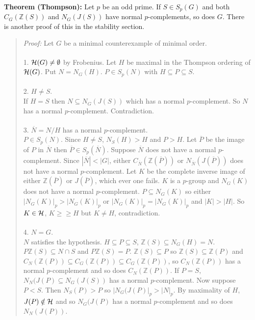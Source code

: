 {\bf Theorem (Thompson):}  Let $p$ be an odd prime.  If $S \in S_p(G)$ and both $C_G({\mathbb Z}(S))$ and $N_G(J(S))$ have normal $p$-complements, so does $G$.  There is another proof of this in the
stability section.
\begin{quote}
\emph{Proof:}
Let $G$ be a minimal counterexample of minimal order.
\\
\\
1. ${\cal H}(G) \neq \emptyset$ by Frobenius. Let $H$ be maximal in the Thompson ordering of ${\cal H}(G)$.
Put $N = N_G(H)$.  $P \in S_p(N)$ with $H \subseteq P \subseteq S$.
\\
\\
2. $H \neq S$.
\\
If $H = S$ then $N \subseteq N_G(J(S))$ which has a normal $p$-complement.
So $N$ has a normal $p$-complement.
Contradiction.
\\
\\
3. ${\overline N} = N/H$ has a normal $p$-complement.
\\
$P \in S_p(N)$.  Since $H \neq S$, $N_S(H) > H$ and $P > H$.
Let ${\overline P}$ be the image of $P$ in ${\overline N}$ then ${\overline P} \in S_p({\overline N})$.
Suppose ${\overline N}$ does not have a normal $p$-complement.  Since $|{\overline N}| < |G|$, either
$C_{\overline N}({\mathbb Z}({\overline P}))$ or $N_{\overline N}(J({\overline P}))$ does not have a normal $p$-complement.
Let $K$ be the complete inverse image of either ${\mathbb Z}({\overline P})$ or $J({\overline P})$, which ever one fails.
$K$ is a $p$-group and $N_G(K)$ does not have a normal $p$-complement.
$P \subseteq N_G(K)$ so either $|N_G(K)|_p > |N_G(K)|_p$ or
$|N_G(K)|_p = |N_G(K)|_p$ and $|K| > |H|$.  So $K \in {\cal H}$, $K \geq \geq H$ but $K \neq H$, contradiction.
\\
\\
4. $N = G$.
\\
$N$ satisfies the hypothesis. $H \subseteq P \subseteq S$, ${\mathbb Z}(S) \subseteq N_G(H) = N$. $P {\mathbb Z}(S) \subseteq N \cap S$
and $P {\mathbb Z}(S) = P$.  ${\mathbb Z}(S) \subseteq P$ so ${\mathbb Z}(S) \subseteq {\mathbb Z}(P)$ and
$C_N({\mathbb Z}(P)) \subseteq C_G({\mathbb Z}(P)) \subseteq C_G({\mathbb Z}(P))$, so $C_N({\mathbb Z}(P))$ has
a normal $p$-complement and so does $C_N({\mathbb Z}(P))$.
If $P = S$, $N_N(J(P) \subseteq N_G(J(S))$ has a normal $p$-complement.
Now suppose $P < S$.  Then $N_S(P) > P$ so $|N_G(J(P)|_p > |N|_p$.
By maximality of $H$, $J(P) \notin {\cal H}$
and so $N_G(J(P)$ has a normal $p$-complement and so does $N_N(J(P))$.

\end{quote}
